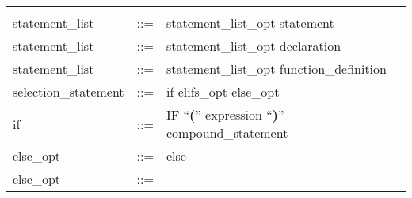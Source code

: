\begin{longtable}{lrl}
\begin{minipage}[t]{\rulerhs}
  \end{minipage}                                                             \\
statement\_list                            & ::= &
  \begin{minipage}[t]{\rulerhs}
    \raggedright
    statement\_list\_opt statement
  \end{minipage}                                                             \\
statement\_list                            & ::= &
  \begin{minipage}[t]{\rulerhs}
    \raggedright
    statement\_list\_opt declaration
  \end{minipage}                                                             \\
statement\_list                            & ::= &
  \begin{minipage}[t]{\rulerhs}
    \raggedright
    statement\_list\_opt function\_definition
  \end{minipage}                                                             \\
selection\_statement                       & ::= &
  \begin{minipage}[t]{\rulerhs}
    \raggedright
    if elifs\_opt else\_opt
  \end{minipage}                                                             \\
if                                         & ::= &
  \begin{minipage}[t]{\rulerhs}
    \raggedright
    IF ``{\bf (}'' expression ``{\bf )}'' compound\_statement
  \end{minipage}                                                             \\
else\_opt                                  & ::= &
  \begin{minipage}[t]{\rulerhs}
    \raggedright
    else
  \end{minipage}                                                             \\
else\_opt                                  & ::= &
  \begin{minipage}[t]{\rulerhs}
    \raggedright
    

\end{minipage}
\end{longtable}
